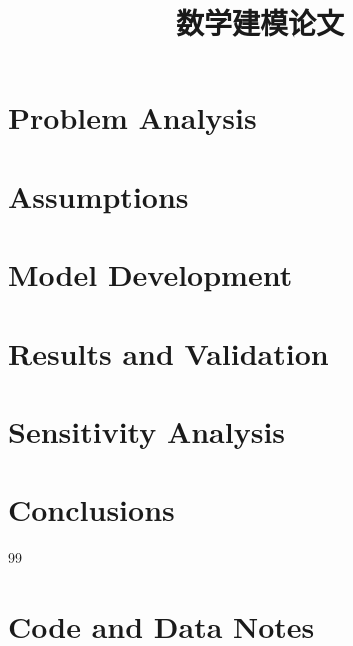 \documentclass[UTF8,12pt,a4paper]{ctexart}
\title{数学建模论文}
\author{}
\date{}
\begin{document}
\maketitle
\begin{abstract}
\end{abstract}
\tableofcontents
\section{Problem Analysis}
\section{Assumptions}
\section{Model Development}
\section{Results and Validation}
\section{Sensitivity Analysis}
\section{Conclusions}
\begin{thebibliography}{99}
\end{thebibliography}
\appendix
\section{Code and Data Notes}
\end{document}
